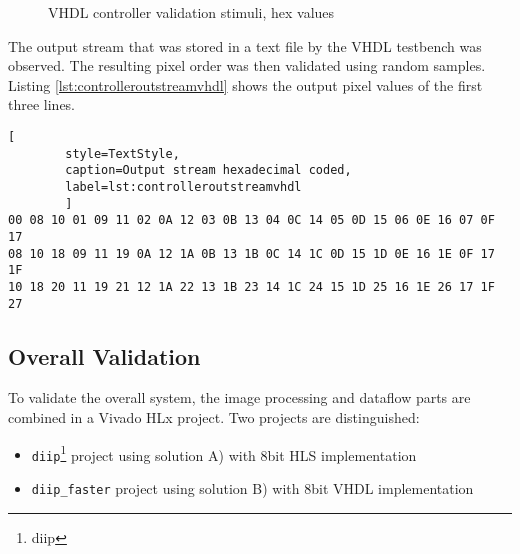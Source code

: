  \begin{figure}[h!]
    \centering
    \begin{adjustbox}{max width=\linewidth}
        
    \end{adjustbox}
    \caption{VHDL controller validation stimuli, hex values}
    \label{fig:vhdlcontrollerstimuli}
\end{figure}

The output stream that was stored in a text file by the VHDL
testbench was observed. The resulting pixel order was then validated using
random samples.
Listing \ref{lst:controlleroutstreamvhdl} shows the output pixel values of the
first three lines.

\begin{minipage}{\linewidth}
    \begin{lstlisting}[
        style=TextStyle, 
        caption=Output stream hexadecimal coded, 
        label=lst:controlleroutstreamvhdl
        ]
00 08 10 01 09 11 02 0A 12 03 0B 13 04 0C 14 05 0D 15 06 0E 16 07 0F 17 
08 10 18 09 11 19 0A 12 1A 0B 13 1B 0C 14 1C 0D 15 1D 0E 16 1E 0F 17 1F
10 18 20 11 19 21 12 1A 22 13 1B 23 14 1C 24 15 1D 25 16 1E 26 17 1F 27\end{lstlisting}
\end{minipage}

%
%
\subsection{Overall Validation}\label{ch:verification:overallvalidation}
To validate the overall system, the image processing and dataflow parts are
combined in a Vivado HLx project. Two projects are distinguished:
\begin{itemize}
    \item \texttt{diip}\footnote{\Gls{diip}} project using solution A) with 8bit HLS
    implementation
    \item \texttt{diip\_faster} project using solution B) with 8bit VHDL
    implementation
\end{itemize}

